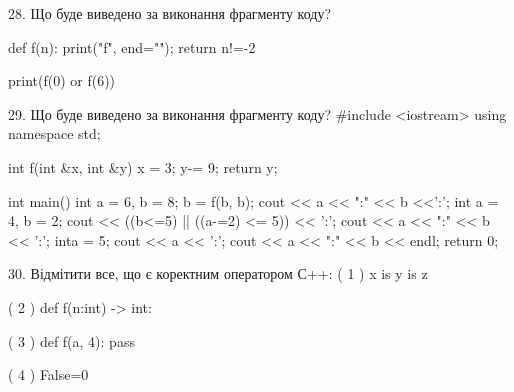 \documentclass[11pt]{article}
\begin{document}
28. Що буде виведено за виконання фрагменту коду?

def f(n):
    print("f", end="");
    return n!=-2

print(f(0) or f(6))

29. Що буде виведено за виконання фрагменту коду?
#include <iostream>
using namespace std;

int f(int &x, int &y){
    x = 3;
    y-= 9;
    return y;
}

int main(){
    int a = 6, b = 8;
    b = f(b, b);
    cout << a << ":" << b <<':';
    {
        int a = 4, b = 2;
        cout << ((b<=5) || ((a-=2) <= 5)) << ':';
        cout << a << ":" << b << ':';
    }
    {
        inta = 5;
        cout << a << ':';
    }
    cout << a << ":" << b << endl;
    return 0;
}


30. Відмітити все, що є коректним оператором С++:
( 1 ) x is y is z

( 2 ) def f(n:int) -> int:

( 3 ) def f(a, 4): pass

( 4 ) False=0































\newpage
\end{document}
